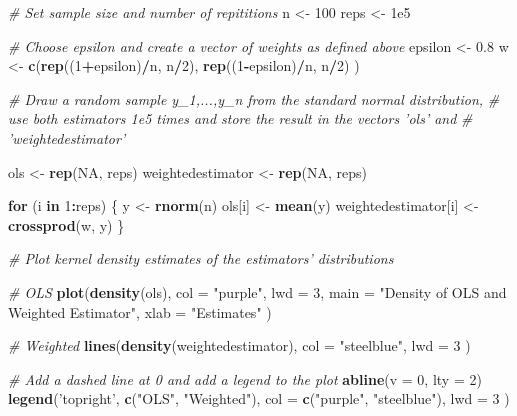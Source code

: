 \documentclass[]{book}
\newenvironment{Shaded}{\begin{snugshade}}{\end{snugshade}}
\newcommand{\KeywordTok}[1]{\textcolor[rgb]{0.13,0.29,0.53}{\textbf{#1}}}
\newcommand{\DataTypeTok}[1]{\textcolor[rgb]{0.13,0.29,0.53}{#1}}
\newcommand{\DecValTok}[1]{\textcolor[rgb]{0.00,0.00,0.81}{#1}}
\newcommand{\FloatTok}[1]{\textcolor[rgb]{0.00,0.00,0.81}{#1}}
\newcommand{\StringTok}[1]{\textcolor[rgb]{0.31,0.60,0.02}{#1}}
\newcommand{\CommentTok}[1]{\textcolor[rgb]{0.56,0.35,0.01}{\textit{#1}}}
\newcommand{\OtherTok}[1]{\textcolor[rgb]{0.56,0.35,0.01}{#1}}
\newcommand{\ControlFlowTok}[1]{\textcolor[rgb]{0.13,0.29,0.53}{\textbf{#1}}}
\newcommand{\OperatorTok}[1]{\textcolor[rgb]{0.81,0.36,0.00}{\textbf{#1}}}
\newcommand{\NormalTok}[1]{#1}
\theoremstyle{definition}
\theoremstyle{definition}
\theoremstyle{definition}
\theoremstyle{remark}
\begin{document}
\begin{Shaded}
\begin{Highlighting}[]
\CommentTok{# Set sample size and number of repititions}
\NormalTok{n <-}\StringTok{ }\DecValTok{100}      
\NormalTok{reps <-}\StringTok{ }\FloatTok{1e5}

\CommentTok{# Choose epsilon and create a vector of weights as defined above}
\NormalTok{epsilon <-}\StringTok{ }\FloatTok{0.8}
\NormalTok{w <-}\StringTok{ }\KeywordTok{c}\NormalTok{(}\KeywordTok{rep}\NormalTok{((}\DecValTok{1}\OperatorTok{+}\NormalTok{epsilon)}\OperatorTok{/}\NormalTok{n, n}\OperatorTok{/}\DecValTok{2}\NormalTok{), }
       \KeywordTok{rep}\NormalTok{((}\DecValTok{1}\OperatorTok{-}\NormalTok{epsilon)}\OperatorTok{/}\NormalTok{n, n}\OperatorTok{/}\DecValTok{2}\NormalTok{) }
\NormalTok{      )}

\CommentTok{# Draw a random sample y_1,...,y_n from the standard normal distribution, }
\CommentTok{# use both estimators 1e5 times and store the result in the vectors 'ols' and }
\CommentTok{# 'weightedestimator'}

\NormalTok{ols <-}\StringTok{ }\KeywordTok{rep}\NormalTok{(}\OtherTok{NA}\NormalTok{, reps)}
\NormalTok{weightedestimator <-}\StringTok{ }\KeywordTok{rep}\NormalTok{(}\OtherTok{NA}\NormalTok{, reps)}

\ControlFlowTok{for}\NormalTok{ (i }\ControlFlowTok{in} \DecValTok{1}\OperatorTok{:}\NormalTok{reps) \{}
\NormalTok{  y <-}\StringTok{ }\KeywordTok{rnorm}\NormalTok{(n)}
\NormalTok{  ols[i] <-}\StringTok{ }\KeywordTok{mean}\NormalTok{(y)}
\NormalTok{  weightedestimator[i] <-}\StringTok{ }\KeywordTok{crossprod}\NormalTok{(w, y)}
\NormalTok{\}}

\CommentTok{# Plot kernel density estimates of the estimators' distributions }

\CommentTok{# OLS}
\KeywordTok{plot}\NormalTok{(}\KeywordTok{density}\NormalTok{(ols), }
     \DataTypeTok{col =} \StringTok{"purple"}\NormalTok{, }
     \DataTypeTok{lwd =} \DecValTok{3}\NormalTok{, }
     \DataTypeTok{main =} \StringTok{"Density of OLS and Weighted Estimator"}\NormalTok{,}
     \DataTypeTok{xlab =} \StringTok{"Estimates"}
\NormalTok{     )}

\CommentTok{# Weighted}
\KeywordTok{lines}\NormalTok{(}\KeywordTok{density}\NormalTok{(weightedestimator), }
      \DataTypeTok{col =} \StringTok{"steelblue"}\NormalTok{, }
      \DataTypeTok{lwd =} \DecValTok{3}
\NormalTok{      ) }

\CommentTok{# Add a dashed line at 0 and add a legend to the plot}
\KeywordTok{abline}\NormalTok{(}\DataTypeTok{v =} \DecValTok{0}\NormalTok{, }\DataTypeTok{lty =} \DecValTok{2}\NormalTok{)}
\KeywordTok{legend}\NormalTok{(}\StringTok{'topright'}\NormalTok{, }
       \KeywordTok{c}\NormalTok{(}\StringTok{"OLS"}\NormalTok{, }\StringTok{"Weighted"}\NormalTok{), }
       \DataTypeTok{col =} \KeywordTok{c}\NormalTok{(}\StringTok{"purple"}\NormalTok{, }\StringTok{"steelblue"}\NormalTok{), }
       \DataTypeTok{lwd =} \DecValTok{3}
\NormalTok{       )}
\end{Highlighting}
\end{Shaded}
\end{document}
